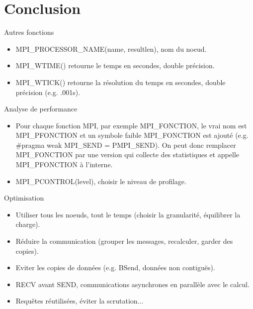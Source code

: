 \documentclass[10pt]{beamer}
\begin{document}
\section{Conclusion}

\begin{frame}{Autres fonctions}

  \begin{itemize}
    \item MPI\_PROCESSOR\_NAME(name, resultlen), nom du noeud.

    \item MPI\_WTIME() retourne le temps en secondes, double précision.

    \item MPI\_WTICK() retourne la résolution du temps en secondes, double précision (e.g. .001s).
  \end{itemize}
\end{frame}

\begin{frame}{Analyse de performance}

  \begin{itemize}
    \item Pour chaque fonction MPI, par exemple MPI\_FONCTION, le vrai nom est MPI\_PFONCTION et un symbole faible MPI\_FONCTION est ajouté (e.g. \#pragma weak MPI\_SEND = PMPI\_SEND). On peut donc remplacer MPI\_FONCTION par une version qui collecte des statistiques et appelle MPI\_PFONCTION à l'interne.

    \item MPI\_PCONTROL(level), choisir le niveau de profilage.
  \end{itemize}
\end{frame}

\begin{frame}{Optimisation}

  \begin{itemize}
    \item Utiliser tous les noeuds, tout le temps (choisir la granularité, équilibrer la charge).

    \item Réduire la communication (grouper les messages, recalculer, garder des copies).

    \item Eviter les copies de données (e.g. BSend, données non contiguës).

    \item RECV avant SEND, communications asynchrones en parallèle avec le calcul.

    \item Requêtes réutilisées, éviter la scrutation...
  \end{itemize}
\end{frame}
\end{document}

